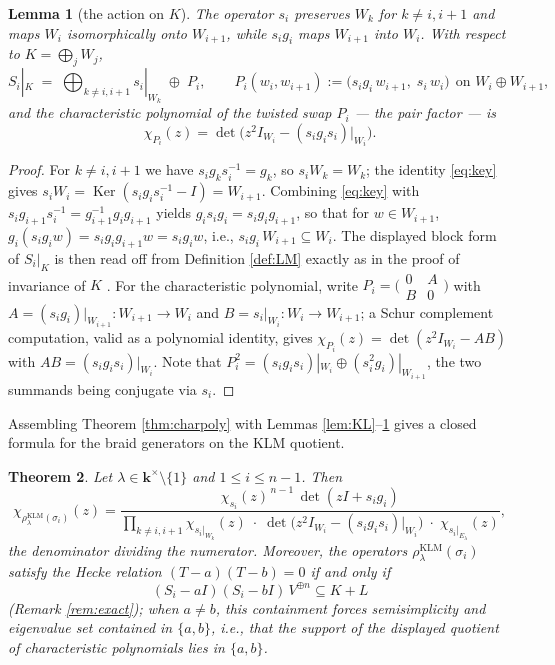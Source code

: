 \documentclass[11pt]{article}
\newtheorem{theorem}{Theorem}[section]
\newtheorem{lemma}[theorem]{Lemma}
\theoremstyle{definition}
\theoremstyle{remark}
\newcommand{\Ker}{\operatorname{Ker}}
\newcommand{\kk}{\boldsymbol{k}}
\newcommand{\rKLM}{\rho^{\mathrm{KLM}}_{\lambda}}
\begin{document}
\begin{lemma}[the action on $K$]\label{lem:Kaction}
The operator $s_i$ preserves $W_k$ for $k \neq i, i+1$ and maps $W_i$
isomorphically onto $W_{i+1}$, while $s_i g_i$ maps $W_{i+1}$ into
$W_i$. With respect to $K = \bigoplus_j W_j$,
\[
S_i|_K \;=\; \bigoplus_{k \neq i, i+1} s_i|_{W_k}
\;\oplus\; P_i,
\qquad
P_i(w_i, w_{i+1}) := \bigl(s_i g_i\, w_{i+1},\; s_i\, w_i\bigr)
\ \ \text{on } W_i \oplus W_{i+1},
\]
and the characteristic polynomial of the twisted swap $P_i$ --- the
\emph{pair factor} --- is
\[
\chi_{P_i}(z) = \det\!\bigl(z^2 I_{W_i} - (s_i g_i s_i)|_{W_i}\bigr).
\]
\end{lemma}

\begin{proof}
For $k \neq i, i+1$ we have $s_i g_k s_i^{-1} = g_k$, so
$s_i W_k = W_k$; the identity \eqref{eq:key} gives
$s_i W_i = \Ker(s_i g_i s_i^{-1} - I) = W_{i+1}$. Combining
\eqref{eq:key} with $s_i g_{i+1} s_i^{-1} = g_{i+1}^{-1} g_i g_{i+1}$
yields $g_i s_i g_i = s_i g_i g_{i+1}$, so that for
$w \in W_{i+1}$, $g_i(s_i g_i w) = s_i g_i g_{i+1} w = s_i g_i w$,
i.e., $s_i g_i\, W_{i+1} \subseteq W_i$. The displayed block form of
$S_i|_K$ is then read off from Definition \ref{def:LM} exactly as in
the proof of invariance of $K$ \cite{HiroeNegami23, Negami25}. For the
characteristic polynomial, write $P_i = \bigl(\begin{smallmatrix}
0 & A \\ B & 0 \end{smallmatrix}\bigr)$ with
$A = (s_i g_i)|_{W_{i+1}} \colon W_{i+1} \to W_i$ and
$B = s_i|_{W_i} \colon W_i \to W_{i+1}$; a Schur complement computation,
valid as a polynomial identity, gives
$\chi_{P_i}(z) = \det(z^2 I_{W_i} - AB)$ with
$AB = (s_i g_i s_i)|_{W_i}$. Note that
$P_i^2 = (s_i g_i s_i)|_{W_i} \oplus (s_i^2 g_i)|_{W_{i+1}}$, the two
summands being conjugate via $s_i$.
\end{proof}

Assembling Theorem \ref{thm:charpoly} with Lemmas
\ref{lem:KL}--\ref{lem:Kaction} gives a closed formula for the braid
generators on the KLM quotient.

\begin{theorem}\label{thm:generalcharpoly}
Let $\lambda \in \kk^{\times} \setminus \{1\}$ and $1 \le i \le n-1$.
Then
\[
\chi_{\rKLM(\sigma_i)}(z)
=
\frac{\chi_{s_i}(z)^{\,n-1}\,\det(zI + s_i g_i)}
{\displaystyle
\prod_{k \neq i, i+1} \chi_{s_i|_{W_k}}(z)\;\cdot\;
\det\!\bigl(z^2 I_{W_i} - (s_i g_i s_i)|_{W_i}\bigr)\;\cdot\;
\chi_{s_i|_{E_{\lambda}}}(z)},
\]
the denominator dividing the numerator. Moreover, the operators
$\rKLM(\sigma_i)$ satisfy the Hecke relation
$(T - a)(T - b) = 0$ if and only if
\[
(S_i - aI)(S_i - bI)\, V^{\oplus n} \subseteq K + L
\]
(Remark \ref{rem:exact}); when $a \neq b$, this containment forces
semisimplicity and eigenvalue set contained in $\{a, b\}$, i.e., that
the support of the displayed quotient of characteristic polynomials
lies in $\{a, b\}$.
\end{theorem}
\end{document}
